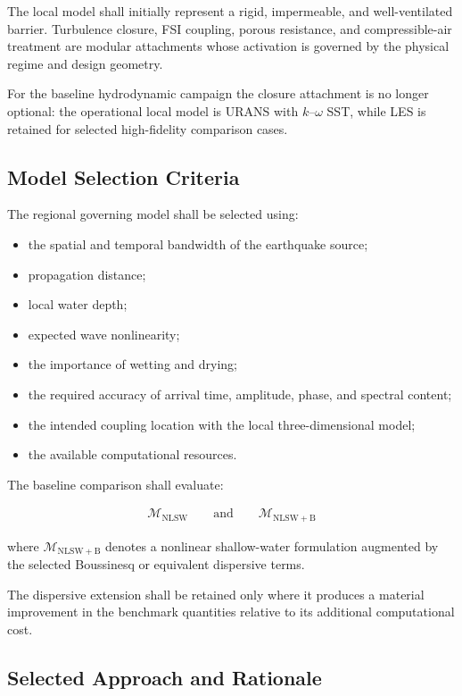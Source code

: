 The local model shall initially represent a rigid, impermeable, and
well-ventilated barrier. Turbulence closure, FSI coupling, porous
resistance, and compressible-air treatment are modular attachments
whose activation is governed by the physical regime and design
geometry.

For the baseline hydrodynamic campaign the closure attachment is no
longer optional: the operational local model is URANS with
$k$--$\omega$ SST, while LES is retained for selected high-fidelity
comparison cases.

\subsection{Model Selection Criteria}
\label{sec:res-mod-eqs-criteria}

The regional governing model shall be selected using:

\begin{itemize}
  \item the spatial and temporal bandwidth of the earthquake source;
  \item propagation distance;
  \item local water depth;
  \item expected wave nonlinearity;
  \item the importance of wetting and drying;
  \item the required accuracy of arrival time, amplitude, phase, and
    spectral content;
  \item the intended coupling location with the local
    three-dimensional model;
  \item the available computational resources.
\end{itemize}

The baseline comparison shall evaluate:

\begin{align}
  \mathcal{M}_{\mathrm{NLSW}}
  \qquad\text{and}\qquad
  \mathcal{M}_{\mathrm{NLSW+B}}
  \label{eq:res-mod-eqs-baseline-comparison}
\end{align}

where $\mathcal{M}_{\mathrm{NLSW+B}}$ denotes a nonlinear
shallow-water formulation augmented by the selected Boussinesq or
equivalent dispersive terms.

The dispersive extension shall be retained only where it produces a
material improvement in the benchmark quantities relative to its
additional computational cost.

\subsection{Selected Approach and Rationale}
\label{sec:res-mod-eqs-selected-approach}

